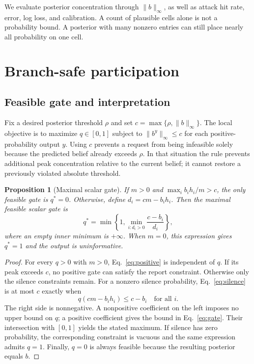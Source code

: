 \documentclass[review,11pt,times]{elsarticle}
\newtheorem{proposition}{Proposition}
\begin{document}
We evaluate posterior concentration through $\|b\|_\infty$, as well as attack hit rate, error, log loss, and calibration. A count of plausible cells alone is not a probability bound. A posterior with many nonzero entries can still place nearly all probability on one cell.

\section{Branch-safe participation}
\label{sec:method}
\subsection{Feasible gate and interpretation}
Fix a desired posterior threshold $\rho$ and set $c=\max\{\rho,\|b\|_\infty\}$. The local objective is to maximize $q\in[0,1]$ subject to $\|b^y\|_\infty\le c$ for each positive-probability output $y$. Using $c$ prevents a request from being infeasible solely because the predicted belief already exceeds $\rho$. In that situation the rule prevents additional peak concentration relative to the current belief; it cannot restore a previously violated absolute threshold.

\begin{proposition}[Maximal scalar gate]
If $m>0$ and $\max_i b_i h_i/m>c$, the only feasible gate is $q^*=0$. Otherwise, define $d_i=cm-b_i h_i$. Then the maximal feasible scalar gate is
\begin{equation}
 q^*=\min\left\{1,\min_{i:d_i>0}\frac{c-b_i}{d_i}\right\},
 \label{eq:gate}
\end{equation}
where an empty inner minimum is $+\infty$. When $m=0$, this expression gives $q^*=1$ and the output is uninformative.
\end{proposition}
\begin{proof}
For every $q>0$ with $m>0$, Eq.~\eqref{eq:positive} is independent of $q$. If its peak exceeds $c$, no positive gate can satisfy the report constraint. Otherwise only the silence constraints remain. For a nonzero silence probability, Eq.~\eqref{eq:silence} is at most $c$ exactly when
\begin{equation}
 q(cm-b_i h_i)\le c-b_i\quad\text{for all }i.
\end{equation}
The right side is nonnegative. A nonpositive coefficient on the left imposes no upper bound on $q$; a positive coefficient gives the bound in Eq.~\eqref{eq:gate}. Their intersection with $[0,1]$ yields the stated maximum. If silence has zero probability, the corresponding constraint is vacuous and the same expression admits $q=1$. Finally, $q=0$ is always feasible because the resulting posterior equals $b$.
\end{proof}
\end{document}
